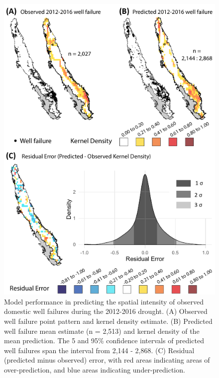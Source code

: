 \begin{figure}%
	\centering
	\includegraphics[width=14cm,keepaspectratio]{ch2_figs/fig_pred_obs_accuracy.pdf}
	\caption{Model performance in predicting the spatial intensity of observed domestic well failures during the 2012-2016 drought. (A) Observed well failure point pattern and kernel density estimate. (B) Predicted well failure mean estimate (n = 2,513) and kernel density of the mean prediction. The 5 and 95\% confidence intervals of predicted well failures span the interval from 2,144 - 2,868. (C) Residual (predicted minus observed) error, with red areas indicating areas of over-prediction, and blue areas indicating under-prediction.}
	\label{fig:pred_obs}
\end{figure}



